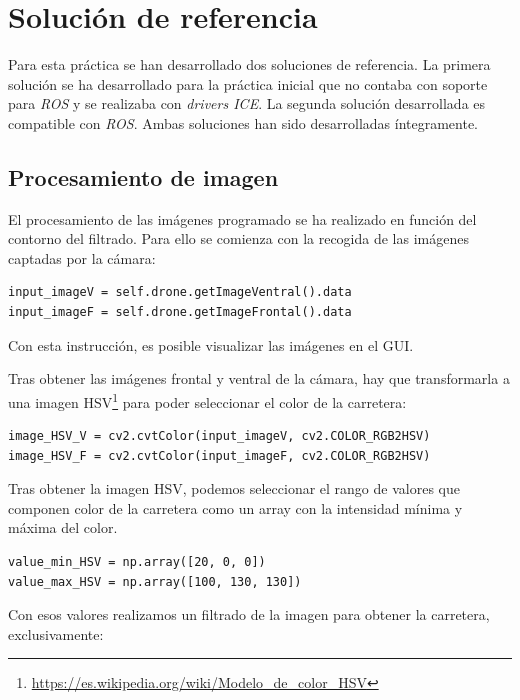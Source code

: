 \section{Solución de referencia}
Para esta práctica se han desarrollado dos soluciones de referencia. La primera solución se ha desarrollado para la práctica inicial que no contaba con soporte para \textit{ROS} y se realizaba con \textit{drivers ICE}. La segunda solución desarrollada es compatible con \textit{ROS}. Ambas soluciones han sido desarrolladas íntegramente.

\subsection{Procesamiento de imagen}
El procesamiento de las imágenes programado se ha realizado en función del contorno del filtrado. Para ello se comienza con la recogida de las imágenes captadas por la cámara:

\lstset{language=Python, breaklines=true, basicstyle=\footnotesize}
\begin{lstlisting}[frame=single]
input_imageV = self.drone.getImageVentral().data
input_imageF = self.drone.getImageFrontal().data
\end{lstlisting}

Con esta instrucción, es posible visualizar las imágenes en el GUI.

Tras obtener las imágenes frontal y ventral de la cámara, hay que transformarla a una imagen HSV\footnote{\url{https://es.wikipedia.org/wiki/Modelo_de_color_HSV}} para poder seleccionar el color de la carretera:

\lstset{language=Python, breaklines=true, basicstyle=\footnotesize}
\begin{lstlisting}[frame=single]
image_HSV_V = cv2.cvtColor(input_imageV, cv2.COLOR_RGB2HSV)
image_HSV_F = cv2.cvtColor(input_imageF, cv2.COLOR_RGB2HSV)
\end{lstlisting}

Tras obtener la imagen HSV, podemos seleccionar el rango de valores que componen color de la carretera como un array con la intensidad mínima y máxima del color.

\lstset{language=Python, breaklines=true, basicstyle=\footnotesize}
\begin{lstlisting}[frame=single]
value_min_HSV = np.array([20, 0, 0])
value_max_HSV = np.array([100, 130, 130])
\end{lstlisting}

Con esos valores realizamos un filtrado de la imagen para obtener la carretera, exclusivamente:

